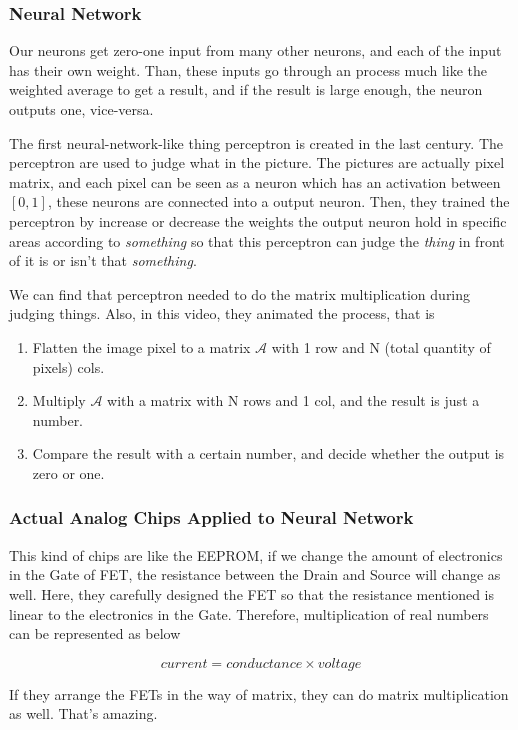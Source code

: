 \documentclass{article}
\begin{document}
\subsubsection{Neural Network}
Our neurons get zero-one input from many other neurons, and each of the input has their own weight. Than, these inputs go through an process much like the weighted average to get a result, and if the result is large enough, the neuron outputs one, vice-versa.

The first neural-network-like thing perceptron is created in the last century. The perceptron are used to judge what in the picture. 
The pictures are actually pixel matrix, and each pixel can be seen as a neuron which has an activation between $[0, 1]$, these neurons are connected into a output neuron. Then, they trained the perceptron by increase or decrease the weights the output neuron hold in specific areas according to \emph{something} so that this perceptron can judge the \emph{thing} in front of it is or isn't that \emph{something}.

We can find that perceptron needed to do the matrix multiplication during judging things. Also, in this video, they animated the process, that is
\begin{enumerate}
	\item Flatten the image pixel to a matrix $\mathcal{A}$ with 1 row and N (total quantity of pixels) cols.
	\item Multiply $\mathcal{A}$ with a matrix with N rows and 1 col, and the result is just a number.
	\item Compare the result with a certain number, and decide whether the output is zero or one.
\end{enumerate}

\subsubsection{Actual Analog Chips Applied to Neural Network}

This kind of chips are like the EEPROM, if we change the amount of electronics in the Gate of FET, the resistance between the Drain and Source will change as well. Here, they carefully designed the FET so that the resistance mentioned is linear to the electronics in the Gate. Therefore, multiplication of real numbers can be represented as below

$$
	current = conductance \times voltage
$$

If they arrange the FETs in the way of matrix, they can do matrix multiplication as well. That's amazing.
\end{document}
